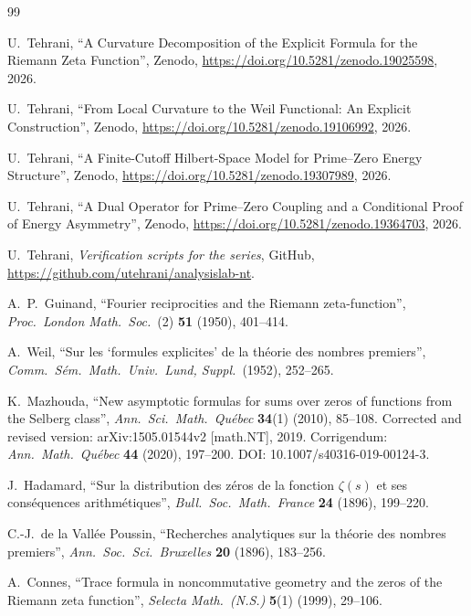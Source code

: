 \documentclass[11pt]{article}
\begin{document}
\newpage
\begin{thebibliography}{99}

U.~Tehrani,
``A Curvature Decomposition of the Explicit Formula
for the Riemann Zeta Function'',
Zenodo, \url{https://doi.org/10.5281/zenodo.19025598}, 2026.

U.~Tehrani,
``From Local Curvature to the Weil Functional:
An Explicit Construction'',
Zenodo, \url{https://doi.org/10.5281/zenodo.19106992}, 2026.

U.~Tehrani,
``A Finite-Cutoff Hilbert-Space Model
for Prime--Zero Energy Structure'',
Zenodo, \url{https://doi.org/10.5281/zenodo.19307989}, 2026.

U.~Tehrani,
``A Dual Operator for Prime--Zero Coupling
and a Conditional Proof of Energy Asymmetry'',
Zenodo, \url{https://doi.org/10.5281/zenodo.19364703}, 2026.

U.~Tehrani,
\emph{Verification scripts for the series},
GitHub, \url{https://github.com/utehrani/analysislab-nt}.

A.~P.~Guinand,
``Fourier reciprocities and the Riemann zeta-function'',
\emph{Proc.\ London Math.\ Soc.}\ (2) \textbf{51} (1950), 401--414.

A.~Weil,
``Sur les `formules explicites' de la th\'eorie des nombres premiers'',
\emph{Comm.\ S\'em.\ Math.\ Univ.\ Lund, Suppl.}\ (1952), 252--265.

K.~Mazhouda,
``New asymptotic formulas for sums over zeros of functions
from the Selberg class'',
\emph{Ann.\ Sci.\ Math.\ Qu\'ebec} \textbf{34}(1) (2010), 85--108.
Corrected and revised version: arXiv:1505.01544v2 [math.NT], 2019.
Corrigendum: \emph{Ann.\ Math.\ Qu\'ebec}
\textbf{44} (2020), 197--200.
DOI: 10.1007/s40316-019-00124-3.

J.~Hadamard,
``Sur la distribution des z\'eros de la fonction $\zeta(s)$
et ses cons\'equences arithm\'etiques'',
\emph{Bull.\ Soc.\ Math.\ France} \textbf{24} (1896), 199--220.

C.-J.~de la Vall\'ee Poussin,
``Recherches analytiques sur la th\'eorie des nombres premiers'',
\emph{Ann.\ Soc.\ Sci.\ Bruxelles} \textbf{20} (1896), 183--256.

A.~Connes,
``Trace formula in noncommutative geometry and the zeros
of the Riemann zeta function'',
\emph{Selecta Math.\ (N.S.)} \textbf{5}(1) (1999), 29--106.


\end{thebibliography}
\end{document}
